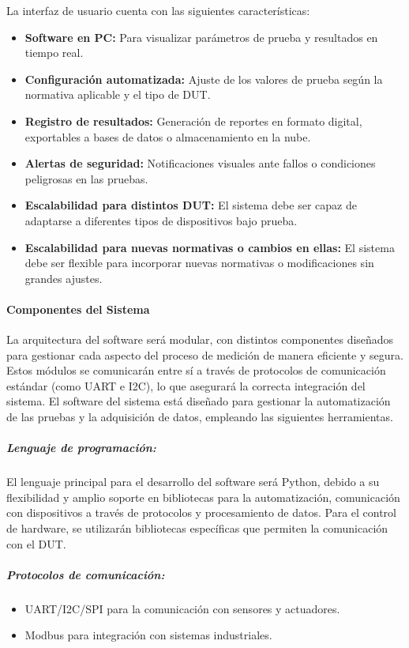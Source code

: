 \documentclass[a4paper,12pt]{article}
\begin{document}
La interfaz de usuario cuenta con las siguientes características:
\begin{itemize}
    \item \textbf{Software en PC:} Para visualizar parámetros de prueba y resultados en tiempo real.
    \item \textbf{Configuración automatizada:} Ajuste de los valores de prueba según la normativa aplicable y el tipo de DUT.
    \item \textbf{Registro de resultados:} Generación de reportes en formato digital, exportables a bases de datos o almacenamiento en la nube.
    \item \textbf{Alertas de seguridad:} Notificaciones visuales ante fallos o condiciones peligrosas en las pruebas.
    \item \textbf{Escalabilidad para distintos DUT:} El sistema debe ser capaz de adaptarse a diferentes tipos de dispositivos bajo prueba.
    \item \textbf{Escalabilidad para nuevas normativas o cambios en ellas:} El sistema debe ser flexible para incorporar nuevas normativas o modificaciones sin grandes ajustes.
\end{itemize}

\paragraph{Componentes del Sistema}
La arquitectura del software será modular, con distintos componentes diseñados para gestionar cada aspecto del proceso de medición de manera eficiente y segura. Estos módulos se comunicarán entre sí a través de protocolos de comunicación estándar (como UART e I2C), lo que asegurará la correcta integración del sistema.
El software del sistema está diseñado para gestionar la automatización de las pruebas y la adquisición de datos, empleando las siguientes herramientas.

\vspace{0.3cm}
\subparagraph{Lenguaje de programación:}
El lenguaje principal para el desarrollo del software será Python, debido a su flexibilidad y amplio soporte en bibliotecas para la automatización, comunicación con dispositivos a través de protocolos y procesamiento de datos. Para el control de hardware, se utilizarán bibliotecas específicas que permiten la comunicación con el DUT.

\vspace{0.3cm}
\subparagraph{Protocolos de comunicación:}
\begin{itemize}
    \item UART/I2C/SPI para la comunicación con sensores y actuadores.
    \item Modbus para integración con sistemas industriales.
\end{itemize}
\end{document}
